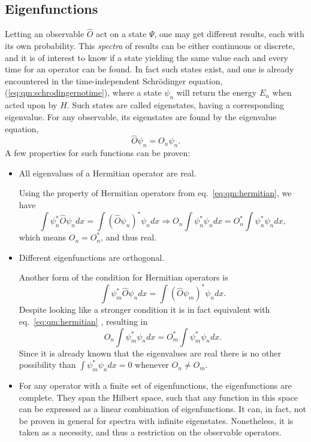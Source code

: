 \subsection{Eigenfunctions}
Letting an observable $\hat{O}$ act on a state $\Psi$, one may get different
results, each with its own probability.
This \textit{spectra} of results can be either continuous or discrete, and it is of interest to know if a state yielding the same value each and every time for an operator can be found.
In fact such states exist, and one is already encountered in the time-independent Schrödinger equation, (\ref{eq:qm:schrodingernotime}), where a state $\psi_n$ will return the energy $E_n$ when acted upon by $\hat{H}$.
Such states are called eigenstates, having a corresponding eigenvalue.
For any observable, its eigenstates are found by the eigenvalue equation,
\begin{equation}
\label{eq:qm:eigenvalue}
\hat{O} \psi_n = O_n \psi_n .
\end{equation}
A few properties for such functions can be proven:
\begin{itemize}
\item All eigenvalues of a Hermitian operator are real.

Using the property of Hermitian operators from eq.~\eqref{eq:qm:hermitian}, we have
\begin{equation}
\int \psi_n^{*} \hat{O} \psi_n dx 
= \int \left(\hat{O} \psi_n\right)^{*} \psi_n dx 
\Rightarrow
O_n \int \psi_n^{*} \psi_n dx 
= O_n^{*} \int \psi_n^{*} \psi_n dx ,
\end{equation}
which means $O_n = O_n^{*}$, and thus real.

\item Different eigenfunctions are orthogonal.

Another form of the condition for Hermitian operators is
\begin{equation}
\int \psi_m^{*} \hat{O} \psi_n dx 
= \int \left(\hat{O} \psi_m\right)^{*} \psi_n dx .
\end{equation}
Despite looking like a stronger condition it is in fact equivalent with eq.~\eqref{eq:qm:hermitian} \cite{griffiths}, resulting in 
\begin{equation}
O_n \int \psi_m^{*} \psi_n dx 
= O_m^{*} \int \psi_m^{*} \psi_n dx .
\end{equation}
Since it is already known that the eigenvalues are real there is no other
possibility than $\int \psi_m^{*} \psi_n dx = 0$ whenever $O_n \neq O_m$.

\item For any operator with a finite set of eigenfunctions, the eigenfunctions
are complete. They span the Hilbert space, such that any function in this space
can be expressed as a linear combination of eigenfunctions. 
It can, in fact, not be proven in general for spectra with infinite eigenstates.
Nonetheless, it is taken as a necessity, and thus a restriction on the observable operators.
\end{itemize}



